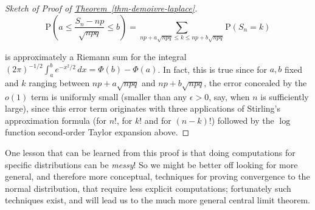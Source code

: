 \begin{proof}[Sketch of Proof of \texorpdfstring{\hyperref[thm-demoivre-laplace]{Theorem~\ref*{thm-demoivre-laplace}}}{Theorem}]
\[
\mathrm{P}\left(a\le \frac{S_n - np}{\sqrt{npq}} \le b\right) = \sum_{np+a\sqrt{npq}\le k\le np+b\sqrt{npq}} \mathrm{P}(S_n=k)
\]

\noindent is approximately a Riemann sum for the integral
$(2\pi)^{-1/2}\int_a^b e^{-x^2/2}\,dx =
\Phi(b)-\Phi(a)$.
In fact, this is true since for $a,b$ fixed and $k$
ranging between $np+a\sqrt{npq}$ and $np+b\sqrt{npq}$,
the error concealed by the $o(1)$ term is uniformly
small (smaller than any $\epsilon>0$, say, when $n$
is sufficiently large), since this error term
originates with three applications of Stirling's
approximation formula (for $n!$, for $k!$ and for
$(n-k)!$) followed by the $\log$ function
second-order Taylor expansion above.
\end{proof}

\noindent One lesson that can be learned from this proof is
that doing computations for specific distributions can
be \emph{messy}! So we might be better off looking for more
general, and therefore more conceptual, techniques for
proving convergence to the normal distribution, that
require less explicit computations; fortunately such
techniques exist, and will lead us to the much more
general central limit theorem.
